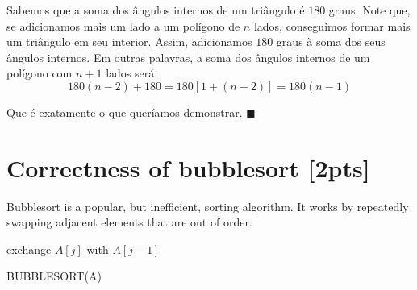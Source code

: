 \documentclass{article}
\newcommand*{\QEDA}{\hfill\ensuremath{\blacksquare}}%
\begin{document}
\begin{enumerate}
\begin{enumerate}[itemsep=0pt, label=(\roman*)]
    Sabemos que a soma dos ângulos internos de um triângulo é $180$ graus. Note que, se adicionamos mais um lado a um polígono de $n$ lados, conseguimos formar mais um triângulo em seu interior. Assim, adicionamos $180$ graus à soma dos seus ângulos internos. Em outras palavras, a soma dos ângulos internos de um polígono com $n+1$ lados será: 
    $$
    180(n-2) + 180 = 180\left [1+(n-2) \right] = 180(n-1)
    $$
    
    Que é exatamente o que queríamos demonstrar. \QEDA
    
    \end{enumerate}
  
\end{enumerate}

\section{Correctness of bubblesort [2pts]}
Bubblesort is a popular, but inefficient, sorting algorithm. It works by repeatedly swapping adjacent elements that are out of order.

\begin{algorithm}[H]
\SetAlgoLined
   {
     {
       {
        exchange $A[j]$ with $A[j-1]$
      }
    }
  }
\caption{BUBBLESORT(A)}
\end{algorithm}
\end{document}
